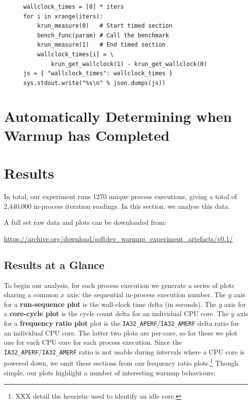 \documentclass[preprint,numbers,10pt]{sigplanconf}
\begin{document}
\begin{figure}[t]
\begin{lstlisting}[label=lst:pyiter, caption={An elided version of the Python
in-process iterations runner (with core cycles etc. removed).}]
wallclock_times = [0] * iters
for i in xrange(iters):
    krun_measure(0)   # Start timed section
    bench_func(param) # Call the benchmark
    krun_measure(1)   # End timed section
    wallclock_times[i] = \
        krun_get_wallclock(1) - krun_get_wallclock(0)
js = { "wallclock_times": wallclock_times }
sys.stdout.write("%s\n" % json.dumps(js))
\end{lstlisting}
\end{figure}


\section{Automatically Determining when Warmup has Completed}
\label{sec:stats}


\section{Results}
\label{sec:Results}

%

In total, our experiment runs  1270 unique process executions, giving a total
of 2,440,000 in-process iteration readings.
In this section, we analyse this data.

A full set raw data and plots can be downloaded from:
\vspace{-.5em}
\begin{center}
{\small%
\url{https://archive.org/download/softdev_warmup_experiment_artefacts/v0.1/}
}
\end{center}

\subsection{Results at a Glance}

To begin our analysis, for each
process execution we generate a series of plots sharing a common $x$
axis: the sequential in-process execution number. The $y$ axis for a
\textbf{run-sequence plot} is the wall-clock time delta (in seconds). The $y$
axis for a \textbf{core-cycle plot} is the cycle count delta for an individual
CPU core. The $y$ axis for a \textbf{frequency ratio plot} plot is the
\texttt{IA32\_APERF}/\texttt{IA32\_AMERF} delta ratio for an individual CPU
core. The latter two plots are per-core, so for these we plot one for each CPU
core for each process execution. Since the
\texttt{IA32\_APERF}/\texttt{IA32\_AMERF} ratio is not usable during intervals
where a CPU core is powered down, we omit these sections from our frequency
ratio plots.\footnote{XXX detail the heuristic used to identify an idle core.}
Though simple, our plots highlight a number of interesting warmup behaviours:
\end{document}

